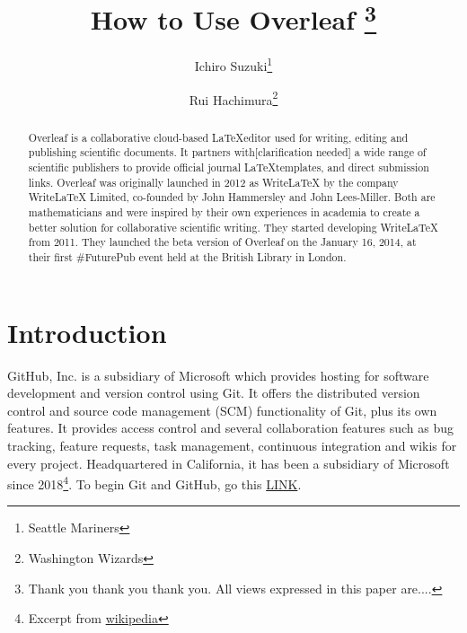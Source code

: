 \documentclass[12pt]{article}
\theoremstyle{hypotheses}
\begin{document}
\title{How to Use Overleaf \thanks{Thank you thank you thank you. All views expressed in this paper are....}}

\author{Ichiro Suzuki\thanks{Seattle Mariners}}
\author{Rui Hachimura\thanks{Washington Wizards}}
\date{}
\maketitle

\begin{abstract}
Overleaf is a collaborative cloud-based \LaTeX editor used for writing, editing and publishing scientific documents. It partners with[clarification needed] a wide range of scientific publishers to provide official journal \LaTeX templates, and direct submission links. Overleaf was originally launched in 2012 as WriteLaTeX by the company WriteLaTeX Limited, co-founded by John Hammersley and John Lees-Miller. Both are mathematicians and were inspired by their own experiences in academia to create a better solution for collaborative scientific writing. They started developing WriteLaTeX from 2011. They launched the beta version of Overleaf on the January 16, 2014, at their first #FuturePub event held at the British Library in London.
\vspace{0in}\\
\bigskip
\end{abstract}

\clearpage


\doublespacing


\section{Introduction}
GitHub, Inc. is a subsidiary of Microsoft which provides hosting for software development and version control using Git. It offers the distributed version control and source code management (SCM) functionality of Git, plus its own features. It provides access control and several collaboration features such as bug tracking, feature requests, task management, continuous integration and wikis for every project. Headquartered in California, it has been a subsidiary of Microsoft since 2018\footnote{ Excerpt from \href{https://en.wikipedia.org/wiki/GitHub}{wikipedia}}.  To begin Git and GitHub, go this \href{https://happygitwithr.com/}{LINK}.
\end{document}
